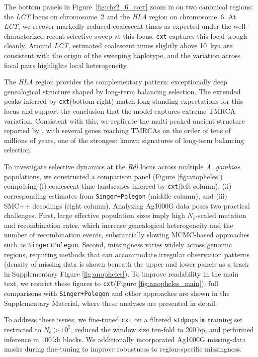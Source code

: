 \documentclass{article}
\newcommand{\cxtkit}{\texttt{cxt}\xspace}
\let\cite\parencite
\begin{document}
The bottom panels in Figure~\ref{fig:chr2_6_corr}
zoom in on two canonical regions: 
the \emph{LCT} locus on chromosome~2 
and the \emph{HLA} region on chromosome~6. 
At \emph{LCT}, we recover markedly reduced coalescent times
as expected under the well-characterized recent selective sweep at this locus. 
\cxtkit captures this local trough cleanly.
Around \emph{LCT}, estimated coalescent times slightly above 10~kya 
are consistent with the origin of the sweeping haplotype, 
and the variation across focal pairs highlights local heterogeneity.

The \emph{HLA} region provides the complementary pattern: 
exceptionally deep genealogical structure shaped by long-term balancing selection. 
The extended peaks inferred by \cxtkit (bottom-right)
match long-standing expectations for this locus 
and support the conclusion that the model captures extreme TMRCA variation.
Consistent with this, 
we replicate the multi-peaked ancient structure reported by \cite{deng2025general},
with several genes reaching TMRCAs on the order of tens of millions of years,
one of the strongest known signatures of long-term balancing selection.


To investigate selective dynamics at the \emph{Rdl} locus across multiple \emph{A. gambiae} populations, 
we constructed a comparison panel (Figure \ref{fig:anopheles}) comprising
(i) coalescent-time landscapes inferred by \cxtkit (left column), 
(ii) corresponding estimates from \texttt{Singer+Polegon} (middle column), and (iii) SMC++ decodings (right column). 
Analyzing Ag1000G data poses two practical challenges.
First, large effective population sizes imply high  $N_{e}$-scaled mutation and recombination rates, 
which increase genealogical heterogeneity and the number of recombination events,
substantially slowing MCMC-based approaches such as \texttt{Singer+Polegon}.
Second, missingness varies widely across genomic regions,
requiring methods that can accommodate irregular observation patterns 
(density of missing data is shown beneath the upper and lower panels as a track in Supplementary Figure \ref{fig:anopheles}). To improve readability in the main text, we restrict these figures to \cxtkit (Figure \ref{fig:anopheles_main}); full comparisons with \texttt{Singer+Polegon} and other approaches are shown in the Supplementary Material, where these analyses are presented in detail.

To address these issues,
we fine-tuned \cxtkit on a filtered \texttt{stdpopsim} training set restricted to $N_e > 10^5$,
reduced the window size ten-fold to 200\,bp,
and performed inference in 100\,kb blocks.
We additionally incorporated Ag1000G missing-data masks during fine-tuning
to improve robustness to region-specific missingness.
\end{document}

